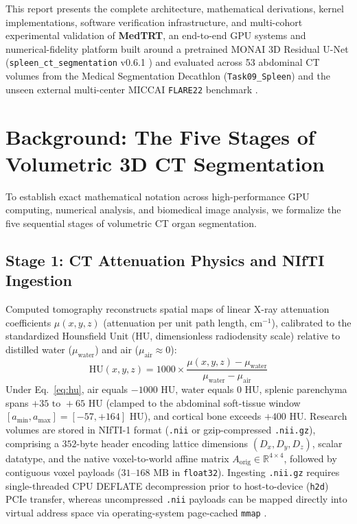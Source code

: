 \documentclass[10pt,twocolumn]{article}
\begin{document}
This report presents the complete architecture, mathematical derivations, kernel implementations, software verification infrastructure, and multi-cohort experimental validation of \textbf{MedTRT}, an end-to-end GPU systems and numerical-fidelity platform built around a pretrained MONAI 3D Residual U-Net (\texttt{spleen\_ct\_segmentation} v0.6.1 \cite{monaibundle2024,xia2018}) and evaluated across 53 abdominal CT volumes from the Medical Segmentation Decathlon (\texttt{Task09\_Spleen}) \cite{antonelli2022,simpson2019} and the unseen external multi-center MICCAI \texttt{FLARE22} benchmark \cite{ma2023flare}.

\section{Background: The Five Stages of Volumetric 3D CT Segmentation}
\label{sec:background}

To establish exact mathematical notation across high-performance GPU computing, numerical analysis, and biomedical image analysis, we formalize the five sequential stages of volumetric CT organ segmentation.

\subsection{Stage 1: CT Attenuation Physics and NIfTI Ingestion}
Computed tomography reconstructs spatial maps of linear X-ray attenuation coefficients $\mu(x,y,z)$ (attenuation per unit path length, $\text{cm}^{-1}$), calibrated to the standardized Hounsfield Unit ($\text{HU}$, dimensionless radiodensity scale) relative to distilled water ($\mu_{\text{water}}$) and air ($\mu_{\text{air}} \approx 0$):
\begin{equation}
    \text{HU}(x, y, z) = 1000 \times \frac{\mu(x, y, z) - \mu_{\text{water}}}{\mu_{\text{water}} - \mu_{\text{air}}}
    \label{eq:hu}
\end{equation}
Under Eq.~\eqref{eq:hu}, air equals $-1000\text{ HU}$, water equals $0\text{ HU}$, splenic parenchyma spans $+35\text{ to }+65\text{ HU}$ (clamped to the abdominal soft-tissue window $[a_{\min}, a_{\max}] = [-57, +164]\text{ HU}$), and cortical bone exceeds $+400\text{ HU}$. Research volumes are stored in NIfTI-1 format (\texttt{.nii} or gzip-compressed \texttt{.nii.gz}), comprising a $352$-byte header encoding lattice dimensions $(D_x, D_y, D_z)$, scalar datatype, and the native voxel-to-world affine matrix $A_{\text{orig}} \in \mathbb{R}^{4 \times 4}$, followed by contiguous voxel payloads ($31\text{--}168\text{ MB}$ in \texttt{float32}). Ingesting \texttt{.nii.gz} requires single-threaded CPU DEFLATE decompression prior to host-to-device (\texttt{h2d}) PCIe transfer, whereas uncompressed \texttt{.nii} payloads can be mapped directly into virtual address space via operating-system page-cached \texttt{mmap} \cite{brett2024}.
\end{document}
